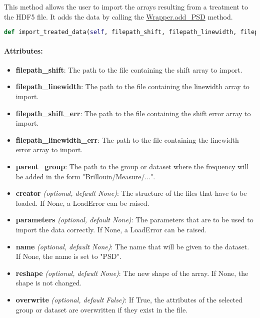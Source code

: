 This method allows the user to import the arrays resulting from a treatment to the HDF5 file. It adds the data by calling the \hyperref[subchapter:wrapper.add_psd]{Wrapper.add\_PSD} method.


\begin{lstlisting}[language=Python]
def import_treated_data(self, filepath_shift, filepath_linewidth, filepath_shift_err, filepath_linewidth_err, parent_group, creator = None, parameters = None, name = None, reshape = None, overwrite = False):
\end{lstlisting}

\paragraph{Attributes:}

\begin{itemize}
    \item \textbf{filepath\_shift}: The path to the file containing the shift array to import.
    \item \textbf{filepath\_linewidth}: The path to the file containing the linewidth array to import.
    \item \textbf{filepath\_shift\_err}: The path to the file containing the shift error array to import.
    \item \textbf{filepath\_linewidth\_err}: The path to the file containing the linewidth error array to import.
    \item \textbf{parent\_group}: The path to the group or dataset where the frequency will be added in the form "Brillouin/Measure/...".
    \item \textbf{creator} \textit{(optional, default None)}: The structure of the files that have to be loaded. If None, a LoadError can be raised.
    \item \textbf{parameters} \textit{(optional, default None)}: The parameters that are to be used to import the data correctly.  If None, a LoadError can be raised.
    \item \textbf{name} \textit{(optional, default None)}: The name that will be given to the dataset. If None, the name is set to "PSD".
    \item \textbf{reshape} \textit{(optional, default None)}: The new shape of the array. If None, the shape is not changed.
    \item \textbf{overwrite} \textit{(optional, default False)}: If True, the attributes of the selected group or dataset are overwritten if they exist in the file.
\end{itemize}


